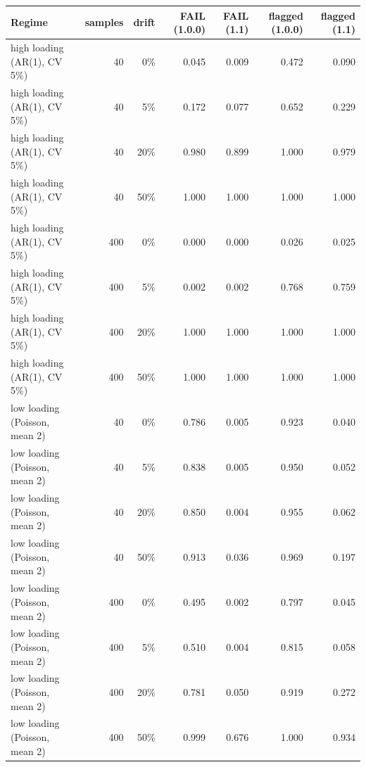 \begin{tabular}{lrrrrrr}
\toprule
Regime & samples & drift & FAIL (1.0.0) & FAIL (1.1) & flagged (1.0.0) & flagged (1.1) \\
\midrule
high loading (AR(1), CV 5\%) & 40 & 0\% & 0.045 & 0.009 & 0.472 & 0.090 \\
high loading (AR(1), CV 5\%) & 40 & 5\% & 0.172 & 0.077 & 0.652 & 0.229 \\
high loading (AR(1), CV 5\%) & 40 & 20\% & 0.980 & 0.899 & 1.000 & 0.979 \\
high loading (AR(1), CV 5\%) & 40 & 50\% & 1.000 & 1.000 & 1.000 & 1.000 \\
high loading (AR(1), CV 5\%) & 400 & 0\% & 0.000 & 0.000 & 0.026 & 0.025 \\
high loading (AR(1), CV 5\%) & 400 & 5\% & 0.002 & 0.002 & 0.768 & 0.759 \\
high loading (AR(1), CV 5\%) & 400 & 20\% & 1.000 & 1.000 & 1.000 & 1.000 \\
high loading (AR(1), CV 5\%) & 400 & 50\% & 1.000 & 1.000 & 1.000 & 1.000 \\
low loading (Poisson, mean 2) & 40 & 0\% & 0.786 & 0.005 & 0.923 & 0.040 \\
low loading (Poisson, mean 2) & 40 & 5\% & 0.838 & 0.005 & 0.950 & 0.052 \\
low loading (Poisson, mean 2) & 40 & 20\% & 0.850 & 0.004 & 0.955 & 0.062 \\
low loading (Poisson, mean 2) & 40 & 50\% & 0.913 & 0.036 & 0.969 & 0.197 \\
low loading (Poisson, mean 2) & 400 & 0\% & 0.495 & 0.002 & 0.797 & 0.045 \\
low loading (Poisson, mean 2) & 400 & 5\% & 0.510 & 0.004 & 0.815 & 0.058 \\
low loading (Poisson, mean 2) & 400 & 20\% & 0.781 & 0.050 & 0.919 & 0.272 \\
low loading (Poisson, mean 2) & 400 & 50\% & 0.999 & 0.676 & 1.000 & 0.934 \\
\bottomrule
\end{tabular}

